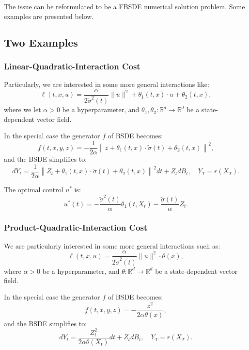 \documentclass[11pt]{article}
\def\w{\widetilde}
\begin{document}
The issue can be reformulated to be a FBSDE numerical solution problem. Some examples are presented below.

\subsection{Two Examples}
\subsubsection{Linear-Quadratic-Interaction Cost}

Particularly, we are interested in some more general interactions like:
\begin{equation}
    \ell(t,x,u) = \frac{\alpha}{2 \w{\sigma}^2(t)}\|u\|^2 + \theta_1(t,x) \cdot u +\theta_2(t,x) ,
\end{equation}
where we let $\alpha > 0$ be a hyperparameter, and $\theta_1, \theta_2 : \mathbb{R}^d \to \mathbb{R}^d$ be a state-dependent vector field.

In the special case the generator $f$ of BSDE becomes:
\begin{equation}
    f(t,x,y,z) = -\frac{1}{2\alpha} \left\| z+ \theta_1(t,x)\cdot \w{\sigma}(t) +\theta_2(t,x) \right\|^2,
\end{equation}
and the BSDE simplifies to:
\begin{equation}
    dY_t =\frac{1}{2\alpha} \left\| Z_t + \theta_1(t,x)\cdot \w{\sigma}(t) +\theta_2(t,x)\right\|^2 dt + Z_t dB_t, \quad Y_T = r(X_T).
\end{equation}

The optimal control $u^*$ is:
\begin{equation}
u^*(t) = - \frac{\w{\sigma}^2(t)}{\alpha} \theta_1(t,X_t) - \frac{\w{\sigma}(t)}{\alpha} Z_t.   
\end{equation}
\subsubsection{Product-Quadratic-Interaction Cost}

We are particularly interested in some more general interactions such as:
\begin{equation}
    \ell(t,x,u) = \frac{\alpha}{2 \w{\sigma}^2(t)}\|u\|^2 \cdot\theta(x),
\end{equation}
where $\alpha> 0$  be a hyperparameter, and $\theta : \mathbb{R}^d \to \mathbb{R}^d$ be a state-dependent vector field.

In the special case the generator $f$ of BSDE  becomes:
\begin{equation}
    f(t,x,y,z) =-\frac{z^2}{2\alpha\theta(x)},
\end{equation}
and the BSDE simplifies to:
\begin{equation}
    dY_t =\frac{Z_t^2}{2\alpha\theta(X_t)} dt + Z_t dB_t, \quad Y_T = r(X_T).
\end{equation}
\end{document}
